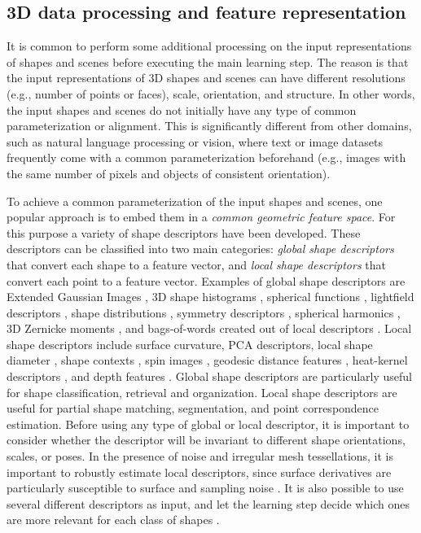 \subsection{3D data processing and feature representation}
It is common to perform some additional processing on the input representations of shapes and scenes before executing the main learning step. The reason is that the input representations of 3D shapes and scenes can have different resolutions (e.g., number of points or faces), scale, orientation, and structure. In other words, the input shapes and scenes do not initially have any type of common parameterization or alignment. This is significantly different from other domains, such as natural language processing or vision, where text or image datasets frequently come with a common parameterization beforehand (e.g., images with the same number of pixels and objects of consistent orientation).

To achieve a common parameterization of the input shapes and scenes, one popular approach is to embed them in a \emph{common geometric feature space}. For this purpose a variety of shape descriptors have been developed. These descriptors can be classified into two main categories: \emph{global shape descriptors} that convert each shape to a feature vector,  and \emph{local shape descriptors} that convert each point to a feature vector. Examples of global shape descriptors are Extended Gaussian Images \cite{Horn:1984:EGI}, 3D shape histograms \cite{Ankerst:1999:3dsh,Chaudhuri:2010:DDS}, spherical functions \cite{Saupe:2001:MRS}, lightfield descriptors \cite{Chen:2003:ovsb}, shape distributions \cite{Osada:2002:sd}, symmetry descriptors \cite{Kazhdan:2004:SD3D}, spherical harmonics \cite{Kazhdan:2003:RISH}, 3D Zernicke moments \cite{Novotni:2003:3DZD}, and bags-of-words created out of local descriptors \cite{Bronstein:2011:SGGW}. Local shape descriptors include surface curvature, PCA descriptors, local shape diameter \cite{Shapira:2008:SDF}, shape contexts \cite{Belongie:2002:SMO,Kalogerakis:2010:LMS,Kokkinos:2012:ISC}, spin images \cite{Johnson:1999:USI}, geodesic distance features \cite{Zhang:2005:FSP}, heat-kernel descriptors \cite{Bronstein:2011:SGGW}, and depth features \cite{Shotton:2011:RLH}. Global shape descriptors are particularly useful for shape classification, retrieval and organization. Local shape descriptors are useful for partial shape matching, segmentation, and point correspondence estimation. Before using any type of global or local descriptor, it is important to consider whether the descriptor will be invariant to different shape orientations, scales, or poses. In the presence of noise and irregular mesh tessellations, it is important to robustly estimate local descriptors, since surface derivatives are particularly susceptible to surface and sampling noise \cite{Kalogerakis:2007:RSE}. It is also possible to use several different descriptors as input, and let the learning step decide which ones are more relevant for each class of shapes \cite{Kalogerakis:2010:LMS}.

